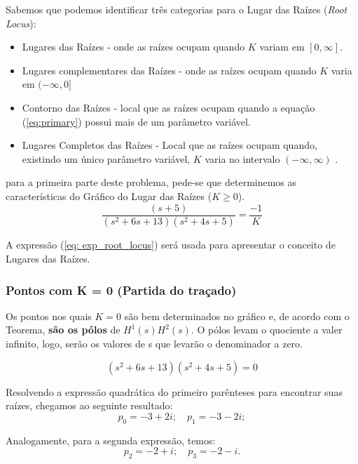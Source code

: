 \documentclass[a4paper, 12pt]{article}
\begin{document}
Sabemos que podemos identificar três categorias para o Lugar das Raízes (\textit{Root Locus}):

\begin{itemize}
    \item Lugares das Raízes - onde as raízes ocupam quando $K$ variam em $[0, \infty]$.
    \item Lugares complementares das Raízes - onde as raízes ocupam quando $K$ varia em $(-\infty, 0]$ 
    \item Contorno das Raízes - local que as raízes ocupam quando a equação (\ref{eq:primary}) possui mais de um parâmetro variável. 
    \item Lugares Completos das Raízes - Local que as raízes ocupam quando, existindo um único parâmetro variável, $K$ varia no intervalo $(−\infty, \infty)$ . 
\end{itemize}


para a primeira parte deste problema, pede-se que determinemos as características do Gráfico do Lugar das Raízes ($K\geq0$).
\begin{equation}\label{eq: exp_root_locus}
    \frac{(s+5)}{(s^2+6s+13)(s^2+4s+5)}=\frac{-1}{K}
\end{equation}

A expressão (\ref{eq: exp_root_locus}) será usada para apresentar o conceito de Lugares das Raízes.



\subsubsection{Pontos com K = 0 (Partida do traçado)}

Os pontos nos quais $K=0$ são bem determinados no gráfico e, de acordo com o Teorema, \textbf{são os pólos} de $H^1(s)H^2(s)$. O pólos levam o quociente a valer infinito, logo, serão os valores de s que levarão o denominador a zero.

\begin{equation}
    (s^2+6s+13)(s^2+4s+5)=0
\end{equation}

Resolvendo a expressão quadrática do primeiro parênteses para encontrar suas raízes, chegamos ao seguinte resultado:
\begin{equation}\label{eq:polos1}
    p_{0}=-3 +2i; \quad     p_{1}=-3 -2i;
\end{equation}

Analogamente, para a segunda expressão, temos:
\begin{equation}\label{eq:polos2}
    p_{2}=-2 +i; \quad p_{3}=-2 -i.
\end{equation}
\end{document}
